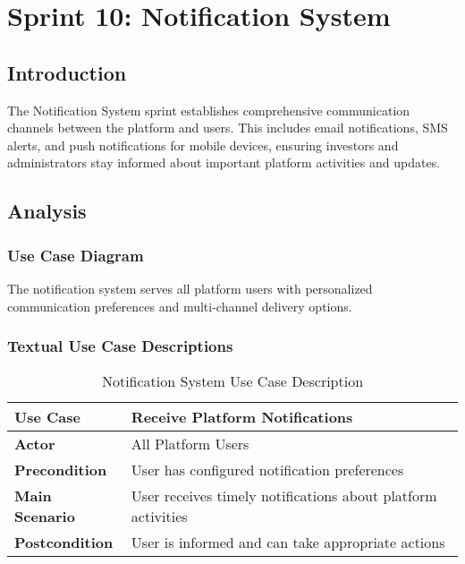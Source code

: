 \newpage

\section{Sprint 10: Notification System}

\subsection{Introduction}
The Notification System sprint establishes comprehensive communication channels between the platform and users. This includes email notifications, SMS alerts, and push notifications for mobile devices, ensuring investors and administrators stay informed about important platform activities and updates.

\subsection{Analysis}
\subsubsection{Use Case Diagram}
The notification system serves all platform users with personalized communication preferences and multi-channel delivery options.


\subsubsection{Textual Use Case Descriptions}

\begin{table}[htbp]
    \centering
    \begin{tabular}{|p{3cm}|p{10cm}|}
        \hline
        \textbf{Use Case} & \textbf{Receive Platform Notifications} \\
        \hline
        \textbf{Actor} & All Platform Users \\
        \hline
        \textbf{Precondition} & User has configured notification preferences \\
        \hline
        \textbf{Main Scenario} & User receives timely notifications about platform activities \\
        \hline
        \textbf{Postcondition} & User is informed and can take appropriate actions \\
        \hline
    \end{tabular}
    \caption{Notification System Use Case Description}
    \label{tab:notification-system-use-case}
\end{table}

